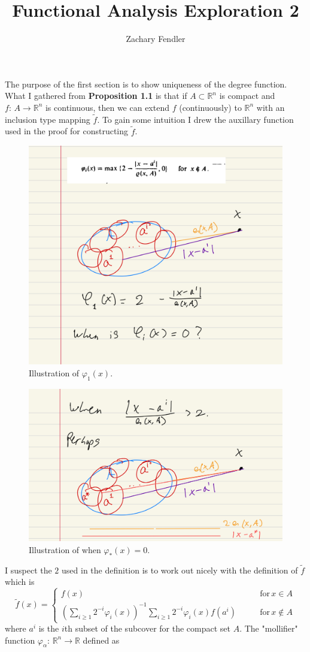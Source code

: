 \documentclass[reqno, 12pt]{article}
\title{Functional Analysis Exploration 2}
\author{Zachary Fendler}
\newcommand{\R}{\mathbb{R}}
\begin{document}
\maketitle
The purpose of the first section is to show uniqueness of the degree function. What I gathered from \textbf{Proposition 1.1} is that if $A \subset \R^n$ is compact and $f: \, A \rightarrow \R^n$ is continuous, then we can extend $f$ (continuously) to $\R^n$ with an inclusion type mapping $\tilde{f}$. To gain some intuition I drew the auxillary function used in the proof for constructing $\tilde{f}$.
\begin{figure}[h]
	\centering
	\includegraphics[width = .5\textwidth]{prop1_1-1.jpeg}
	\caption{Illustration of $\varphi_1(x)$.}
\end{figure}
\begin{figure}[h]
	\centering
	\includegraphics[width = .5\textwidth]{prop1_1-2.jpeg}
	\caption{Illustration of when $\varphi_*(x)=0$.}
\end{figure}
I suspect the $2$ used in the definition is to work out nicely with the definition of $\tilde{f}$ which is
$$\tilde{f}(x) = \begin{cases}
f(x) \qquad &\text{for}\, x \in A \\
\left(\sum_{i\geq 1}2^{-i}\varphi_i(x)\right)^{-1} \sum_{i \geq 1}2^{-i}\varphi_i(x) f(a^i) \qquad &\text{for} \, x \notin A
\end{cases}$$
where $a^i$ is the $i$th subset of the subcover for the compact set $A$. 
The "mollifier" function $\varphi_\alpha : \, \R^n \rightarrow \R$ defined as 
\end{document}
